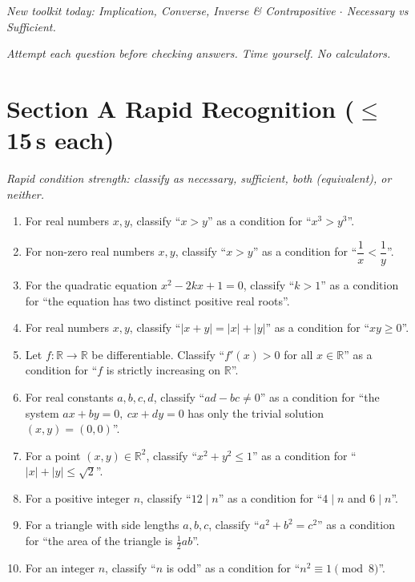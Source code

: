 \documentclass[11pt,a4paper]{article}
\begin{document}
\noindent\textit{New toolkit today: Implication, Converse, Inverse \& Contrapositive $\cdot$ Necessary vs Sufficient.}

\vspace{2pt}
\noindent\textit{Attempt each question before checking answers. Time yourself. No calculators.}

\section*{Section A \quad Rapid Recognition \hfill{\normalfont\small($\leq$15\,s each)}}

\noindent\textit{Rapid condition strength: classify as necessary, sufficient, both (equivalent), or neither.}

\begin{enumerate}

\item For real numbers $x, y$, classify ``$x > y$'' as a condition for ``$x^3 > y^3$''.

\item For non-zero real numbers $x, y$, classify ``$x > y$'' as a condition for ``$\dfrac{1}{x} < \dfrac{1}{y}$''.

\item For the quadratic equation $x^2 - 2kx + 1 = 0$, classify ``$k > 1$'' as a condition for ``the equation has two distinct positive real roots''.

\item For real numbers $x, y$, classify ``$|x + y| = |x| + |y|$'' as a condition for ``$xy \ge 0$''.

\item Let $f:\mathbb{R}\to\mathbb{R}$ be differentiable. Classify ``$f'(x) > 0$ for all $x \in \mathbb{R}$'' as a condition for ``$f$ is strictly increasing on $\mathbb{R}$''.

\item For real constants $a, b, c, d$, classify ``$ad - bc \neq 0$'' as a condition for ``the system $ax + by = 0,\ cx + dy = 0$ has only the trivial solution $(x,y)=(0,0)$''.

\item For a point $(x, y) \in \mathbb{R}^2$, classify ``$x^2 + y^2 \le 1$'' as a condition for ``$|x| + |y| \le \sqrt{2}$''.

\item For a positive integer $n$, classify ``$12 \mid n$'' as a condition for ``$4 \mid n$ and $6 \mid n$''.

\item For a triangle with side lengths $a, b, c$, classify ``$a^2 + b^2 = c^2$'' as a condition for ``the area of the triangle is $\frac{1}{2}ab$''.

\item For an integer $n$, classify ``$n$ is odd'' as a condition for ``$n^2 \equiv 1 \pmod 8$''.

\end{enumerate}
\end{document}

